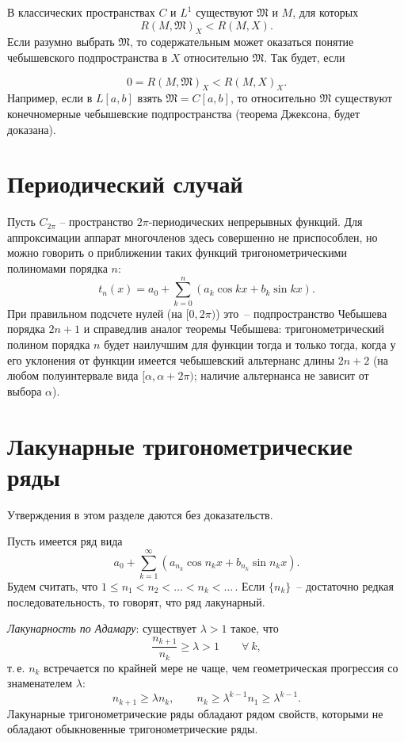 В классических пространствах $C$ и $L^1$ существуют $\mathfrak M$ и $M$, для которых
$$ R(M,\mathfrak M)_X < R(M,X). $$
Если разумно выбрать $\mathfrak M$, то содержательным может оказаться
понятие чебышевского подпространства в $X$ относительно $\mathfrak
M.$ Так будет, если

$$
0=R(M,\mathfrak M)_X < R(M,X)_X.
$$
Например, если в $L[a,b]$ взять $\mathfrak M=C[a,b]$, то относительно
$\mathfrak M$ существуют конечномерные чебышевские подпространства
(теорема Джексона, будет доказана).

\section{Периодический случай}

Пусть $C_{2\pi}$ -- пространство $2\pi$-периодических непрерывных функций.
Для аппроксимации аппарат многочленов здесь совершенно не приспособлен, но можно
говорить о приближении таких функций тригонометрическими полиномами порядка $n$:
$$
t_n(x)=a_0+\sum\limits_{k=0}^n (a_k \cos kx+b_k \sin kx).
$$
При правильном подсчете нулей (на $[0,2\pi)$) это~-- {подпространство}
Чебышева порядка $2n+1$ и справедлив аналог теоремы Чебышева:
тригонометрический полином порядка $n$ будет наилучшим {для функции}
тогда и только тогда, когда {у его} {уклонения от функции} имеется
чебышевский альтернанс длины $2n+2$ (на любом полуинтервале вида
$[\alpha,\alpha+2\pi)$; наличие альтернанса не зависит от выбора $\alpha$).

\section{Лакунарные тригонометрические ряды}

Утверждения в этом разделе даются без доказательств.

Пусть имеется ряд вида
\begin{equation}\label{l13-lakuna}
a_0+\sum\limits_{k=1}^{\infty} (a_{n_k}\cos n_k x+b_{n_k}\sin n_k
x).
\end{equation}
Будем считать, что $1\le n_1<n_2<\ldots<n_k<\ldots\,.$ Если $\{n_k\}$~--
достаточно редкая последовательность, то говорят, что ряд лакунарный.

\textit{Лакунарность по Адамару}: существует $\lambda>1$ такое, что
$$
\frac{n_{k+1}}{n_k}\ge \lambda>1\qquad \forall\ k,
$$
т.\,е. $n_k$ встречается по крайней мере не чаще, чем геометрическая
прогрессия со знаменателем $\lambda$:
$$
n_{k+1}\ge \lambda n_k,\qquad n_k\ge \lambda^{k-1} n_1\ge \lambda^{k-1}.
$$
Лакунарные тригонометрические ряды обладают рядом свойств, которыми не
обладают обыкновенные тригонометрические ряды.

